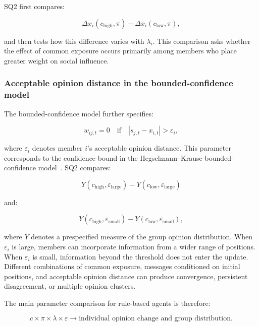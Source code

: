\documentclass[11pt,a4paper]{article}
\begin{document}
SQ2 first compares:

\begin{equation*}
\Delta x_i(c_{\text{high}},\pi)
-
\Delta x_i(c_{\text{low}},\pi),
\end{equation*}

and then tests how this difference varies with $\lambda_i$. This comparison asks whether the effect of common exposure occurs primarily among members who place greater weight on social influence.

\subsubsection{Acceptable opinion distance in the bounded-confidence model}

The bounded-confidence model further specifies:

\begin{equation*}
w_{ij,t}=0
\quad\text{if}\quad
|s_{j,t}-x_{i,t}|>\varepsilon_i,
\end{equation*}

where $\varepsilon_i$ denotes member $i$'s acceptable opinion distance. This parameter corresponds to the confidence bound in the Hegselmann--Krause bounded-confidence model~\citep{hegselmann2002}. SQ2 compares:

\begin{equation*}
Y(c_{\text{high}},\varepsilon_{\text{large}})
-
Y(c_{\text{low}},\varepsilon_{\text{large}})
\end{equation*}

and:

\begin{equation*}
Y(c_{\text{high}},\varepsilon_{\text{small}})
-
Y(c_{\text{low}},\varepsilon_{\text{small}}),
\end{equation*}

where $Y$ denotes a prespecified measure of the group opinion distribution. When $\varepsilon_i$ is large, members can incorporate information from a wider range of positions. When $\varepsilon_i$ is small, information beyond the threshold does not enter the update. Different combinations of common exposure, messages conditioned on initial positions, and acceptable opinion distance can produce convergence, persistent disagreement, or multiple opinion clusters.

The main parameter comparison for rule-based agents is therefore:

\begin{equation*}
\boxed{
c
\times
\pi
\times
\lambda
\times
\varepsilon
\rightarrow
\text{individual opinion change and group distribution}
}.
\end{equation*}
\end{document}
